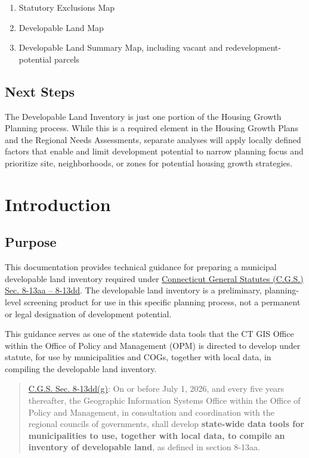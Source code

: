 \documentclass[
  letterpaper,
  DIV=11,
  numbers=noendperiod]{scrreprt}
\begin{document}
\begin{enumerate}
\def\labelenumi{\arabic{enumi}.}
\item
  Statutory Exclusions Map
\item
  Developable Land Map
\item
  Developable Land Summary Map, including vacant and
  redevelopment-potential parcels
\end{enumerate}

\section*{Next Steps}\label{next-steps}


The Developable Land Inventory is just one portion of the Housing Growth
Planning process. While this is a required element in the Housing Growth
Plans and the Regional Needs Assessments, separate analyses will apply
locally defined factors that enable and limit development potential to
narrow planning focus and prioritize site, neighborhoods, or zones for
potential housing growth strategies.


\chapter{Introduction}\label{introduction}

\section{Purpose}\label{purpose}

This documentation provides technical guidance for preparing a municipal
developable land inventory required under
\href{https://cga.ct.gov/2026/sup/chap_124b.htm}{Connecticut General
Statutes (C.G.S.) Sec. 8-13aa -- 8-13dd}. The developable land inventory
is a preliminary, planning-level screening product for use in this
specific planning process, not a permanent or legal designation of
development potential.

This guidance serves as one of the statewide data tools that the CT GIS
Office within the Office of Policy and Management (OPM) is directed to
develop under statute, for use by municipalities and COGs, together with
local data, in compiling the developable land inventory.

\begin{quote}
\href{https://cga.ct.gov/2026/sup/chap_124b.htm\#sec_8-13dd}{C.G.S. Sec.
8-13dd(g)}: On or before July 1, 2026, and every five years thereafter,
the Geographic Information Systems Office within the Office of Policy
and Management, in consultation and coordination with the regional
councils of governments, shall develop \textbf{state-wide data tools for
municipalities to use, together with local data, to compile an inventory
of developable land}, as defined in section 8-13aa.
\end{quote}
\end{document}
